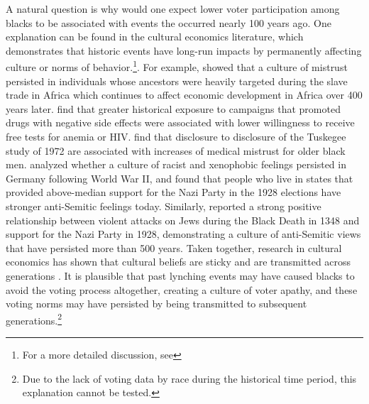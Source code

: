 \documentclass[AEJ, finalmode]{AEA}
\begin{document}
A natural question is why would one expect lower voter participation among blacks to be associated with events the occurred nearly 100 years ago. One explanation can be found in the cultural economics literature, which demonstrates that historic events have long-run impacts by permanently affecting culture or norms of behavior.\footnote{For a more detailed discussion, see }. For example,  showed that a culture of mistrust persisted in individuals whose ancestors were heavily targeted during the slave trade in Africa which continues to affect economic development in Africa over 400 years later.  find that greater historical exposure to campaigns that promoted drugs with negative side effects were associated with lower willingness to receive free tests for anemia or HIV.  find that disclosure to disclosure of the Tuskegee study of 1972 are associated with increases of medical mistrust for older black men.  analyzed whether a culture of racist and xenophobic feelings persisted in Germany following World War II, and found that people who live in states that provided above-median support for the Nazi Party in the 1928 elections have stronger anti-Semitic feelings today. Similarly,  reported a strong positive relationship between violent attacks on Jews during the Black Death in 1348 and support for the Nazi Party in 1928, demonstrating a culture of anti-Semitic views that have persisted more than 500 years. Taken together, research in cultural economics has shown that cultural beliefs are sticky and are transmitted across generations \cite{alesina2013origins}. It is plausible that past lynching events may have caused blacks to avoid the voting process altogether, creating a culture of voter apathy, and these voting norms may have persisted by being transmitted to subsequent generations.\footnote{Due to the lack of voting data by race during the historical time period, this explanation cannot be tested.}
\end{document}
